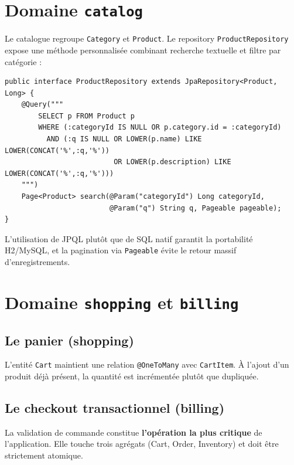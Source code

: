 \documentclass[11pt,a4paper,oneside]{report}
\begin{document}
\section{Domaine \texttt{catalog}}

Le catalogue regroupe \texttt{Category} et \texttt{Product}. Le repository
\texttt{ProductRepository} expose une méthode personnalisée combinant
recherche textuelle et filtre par catégorie :

\begin{lstlisting}[style=javastyle, caption=Recherche multi-critere de produits]
public interface ProductRepository extends JpaRepository<Product, Long> {
    @Query("""
        SELECT p FROM Product p
        WHERE (:categoryId IS NULL OR p.category.id = :categoryId)
          AND (:q IS NULL OR LOWER(p.name) LIKE LOWER(CONCAT('%',:q,'%'))
                          OR LOWER(p.description) LIKE LOWER(CONCAT('%',:q,'%')))
    """)
    Page<Product> search(@Param("categoryId") Long categoryId,
                         @Param("q") String q, Pageable pageable);
}
\end{lstlisting}

L'utilisation de JPQL plutôt que de SQL natif garantit la portabilité
H2/MySQL, et la pagination via \texttt{Pageable} évite le retour massif
d'enregistrements.

\section{Domaine \texttt{shopping} et \texttt{billing}}

\subsection{Le panier (shopping)}
L'entité \texttt{Cart} maintient une relation \texttt{@OneToMany} avec
\texttt{CartItem}. À l'ajout d'un produit déjà présent, la quantité est
incrémentée plutôt que dupliquée.

\subsection{Le checkout transactionnel (billing)}
La validation de commande constitue \textbf{l'opération la plus critique}
de l'application. Elle touche trois agrégats (Cart, Order, Inventory) et
doit être strictement atomique.
\end{document}
